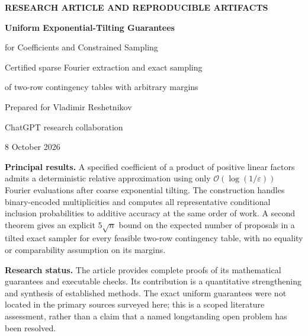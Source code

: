 \documentclass[11pt,a4paper]{article}
\theoremstyle{definition}
\newcommand{\BigO}{\mathcal O}
\begin{document}
\hypersetup{pageanchor=false}
\begin{titlepage}
\centering
\vspace*{16mm}
{\small\bfseries\color{teal} RESEARCH ARTICLE AND REPRODUCIBLE ARTIFACTS\par}
\vspace{12mm}
{\Huge\bfseries\color{navy} Uniform Exponential-Tilting Guarantees\par}
\vspace{6mm}
{\LARGE for Coefficients and Constrained Sampling\par}
\vspace{11mm}
{\large Certified sparse Fourier extraction and exact sampling\par}
{\large of two-row contingency tables with arbitrary margins\par}
\vspace{18mm}
{\large Prepared for Vladimir Reshetnikov\par}
{\normalsize ChatGPT research collaboration\par}
\vspace{5mm}
{8 October 2026\par}
\vfill
\begin{minipage}{0.88\textwidth}
\small
\textbf{Principal results.} A specified coefficient of a product of positive linear factors admits a deterministic relative approximation using only $\BigO(\log(1/\varepsilon))$ Fourier evaluations after coarse exponential tilting. The construction handles binary-encoded multiplicities and computes all representative conditional inclusion probabilities to additive accuracy at the same order of work. A second theorem gives an explicit $5\sqrt n$ bound on the expected number of proposals in a tilted exact sampler for every feasible two-row contingency table, with no equality or comparability assumption on its margins.

\textbf{Research status.} The article provides complete proofs of its mathematical guarantees and executable checks. Its contribution is a quantitative strengthening and synthesis of established methods. The exact uniform guarantees were not located in the primary sources surveyed here; this is a scoped literature assessment, rather than a claim that a named longstanding open problem has been resolved.
\end{minipage}
\vspace*{12mm}
\end{titlepage}
\hypersetup{pageanchor=true}
\end{document}
